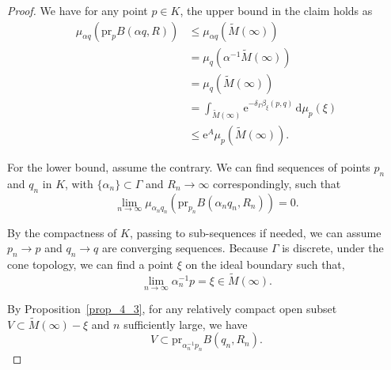 \documentclass[reqno,11pt]{article}
\theoremstyle{definition}
\theoremstyle{remark}
\numberwithin{equation}{section}
\begin{document}
\begin{proof}
	We have for any point $p\in K$, the upper bound in the claim holds as
	\begin{displaymath}
		\begin{aligned}
			\mu_{\alpha q}(\text{pr}_p B(\alpha q,R)) & \leq\mu_{\alpha q}(\widetilde{M}(\infty))                                                        \\
			                                          & =\mu_{q}(\alpha^{-1}\widetilde{M}(\infty))                                                       \\
			                                          & =\mu_{q}(\widetilde{M}(\infty))                                                                  \\
			                                          & =\int_{\widetilde{M}(\infty)}\mathrm{e}^{-\delta_{\Gamma}\beta_{\xi}(p,q)}\,\mathrm{d}\mu_p(\xi) \\
			                                          & \leq\mathrm{e}^{A}\mu_p(\widetilde{M}(\infty)).
		\end{aligned}
	\end{displaymath}

	For the lower bound, assume the contrary. We can find sequences of points $p_n$ and $q_n$ in $K$, with $\{\alpha_n\}\subset\Gamma$ and $R_n\to\infty$ correspondingly, such that
	\begin{displaymath}
		\lim_{n\to\infty} \mu_{\alpha_n q_n}(\text{pr}_{p_n} B(\alpha_n q_n, R_n))=0.
	\end{displaymath}

	By the compactness of $K$, passing to sub-sequences if needed, we can assume $p_n\to p$ and $q_n\to q$ are converging sequences. Because $\Gamma$ is discrete, under the cone topology, we can find a point $\xi$ on the ideal boundary such that,
	\begin{displaymath}
		\lim_{n\to\infty}\alpha_n^{-1}p=\xi\in\widetilde{M}(\infty).
	\end{displaymath}

	By Proposition~\ref{prop_4_3}, for any relatively compact open subset $V\subset\widetilde{M}(\infty)-{\xi}$ and $n$ sufficiently large, we have
	\begin{displaymath}
		V\subset \text{pr}_{\alpha_n^{-1}p_n}B(q_n,R_n).
	\end{displaymath}


\end{proof}
\end{document}
